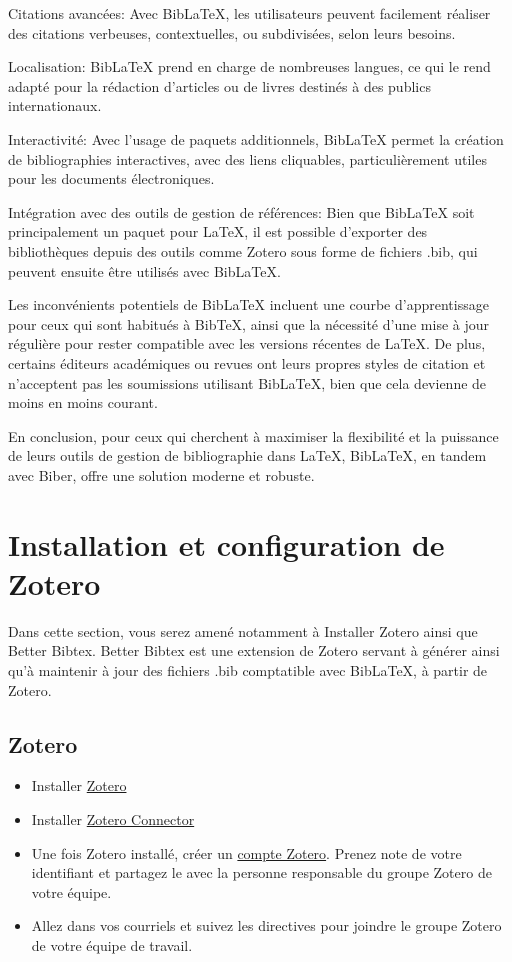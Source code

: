 \documentclass[
  letterpaper,
]{scrbook}
\begin{document}
Citations avancées: Avec BibLaTeX, les utilisateurs peuvent facilement
réaliser des citations verbeuses, contextuelles, ou subdivisées, selon
leurs besoins.

Localisation: BibLaTeX prend en charge de nombreuses langues, ce qui le
rend adapté pour la rédaction d'articles ou de livres destinés à des
publics internationaux.

Interactivité: Avec l'usage de paquets additionnels, BibLaTeX permet la
création de bibliographies interactives, avec des liens cliquables,
particulièrement utiles pour les documents électroniques.

Intégration avec des outils de gestion de références: Bien que BibLaTeX
soit principalement un paquet pour LaTeX, il est possible d'exporter des
bibliothèques depuis des outils comme Zotero sous forme de fichiers
.bib, qui peuvent ensuite être utilisés avec BibLaTeX.

Les inconvénients potentiels de BibLaTeX incluent une courbe
d'apprentissage pour ceux qui sont habitués à BibTeX, ainsi que la
nécessité d'une mise à jour régulière pour rester compatible avec les
versions récentes de LaTeX. De plus, certains éditeurs académiques ou
revues ont leurs propres styles de citation et n'acceptent pas les
soumissions utilisant BibLaTeX, bien que cela devienne de moins en moins
courant.

En conclusion, pour ceux qui cherchent à maximiser la flexibilité et la
puissance de leurs outils de gestion de bibliographie dans LaTeX,
BibLaTeX, en tandem avec Biber, offre une solution moderne et robuste.

\hypertarget{installation-et-configuration-de-zotero}{%
\section{Installation et configuration de
Zotero}\label{installation-et-configuration-de-zotero}}

Dans cette section, vous serez amené notamment à Installer Zotero ainsi
que Better Bibtex. Better Bibtex est une extension de Zotero servant à
générer ainsi qu'à maintenir à jour des fichiers .bib comptatible avec
BibLaTeX, à partir de Zotero.

\hypertarget{zotero}{%
\subsection{Zotero}\label{zotero}}

\begin{itemize}
\item
  Installer \href{https://www.zotero.org/download/}{Zotero}
\item
  Installer \href{https://www.zotero.org/download/}{Zotero Connector}
\item
  Une fois Zotero installé, créer un
  \href{https://www.zotero.org/user/register/}{compte Zotero}. Prenez
  note de votre identifiant et partagez le avec la personne responsable
  du groupe Zotero de votre équipe.
\item
  Allez dans vos courriels et suivez les directives pour joindre le
  groupe Zotero de votre équipe de travail.
\end{itemize}
\end{document}
